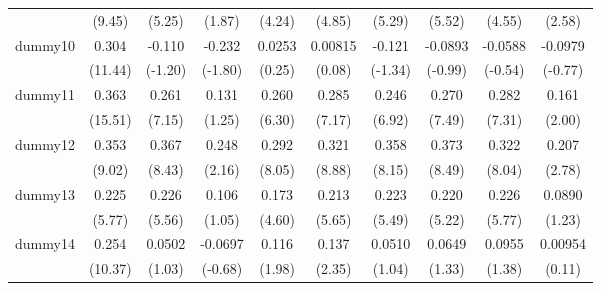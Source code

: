 {\begin{tabular}{l*{9}{c}}
            &      (9.45)         &      (5.25)         &      (1.87)         &      (4.24)         &      (4.85)         &      (5.29)         &      (5.52)         &      (4.55)         &      (2.58)         \\
[1em]
dummy10     &       0.304\sym{***}&      -0.110         &      -0.232         &      0.0253         &     0.00815         &      -0.121         &     -0.0893         &     -0.0588         &     -0.0979         \\
            &     (11.44)         &     (-1.20)         &     (-1.80)         &      (0.25)         &      (0.08)         &     (-1.34)         &     (-0.99)         &     (-0.54)         &     (-0.77)         \\
[1em]
dummy11     &       0.363\sym{***}&       0.261\sym{***}&       0.131         &       0.260\sym{***}&       0.285\sym{***}&       0.246\sym{***}&       0.270\sym{***}&       0.282\sym{***}&       0.161\sym{*}  \\
            &     (15.51)         &      (7.15)         &      (1.25)         &      (6.30)         &      (7.17)         &      (6.92)         &      (7.49)         &      (7.31)         &      (2.00)         \\
[1em]
dummy12     &       0.353\sym{***}&       0.367\sym{***}&       0.248\sym{*}  &       0.292\sym{***}&       0.321\sym{***}&       0.358\sym{***}&       0.373\sym{***}&       0.322\sym{***}&       0.207\sym{**} \\
            &      (9.02)         &      (8.43)         &      (2.16)         &      (8.05)         &      (8.88)         &      (8.15)         &      (8.49)         &      (8.04)         &      (2.78)         \\
[1em]
dummy13     &       0.225\sym{***}&       0.226\sym{***}&       0.106         &       0.173\sym{***}&       0.213\sym{***}&       0.223\sym{***}&       0.220\sym{***}&       0.226\sym{***}&      0.0890         \\
            &      (5.77)         &      (5.56)         &      (1.05)         &      (4.60)         &      (5.65)         &      (5.49)         &      (5.22)         &      (5.77)         &      (1.23)         \\
[1em]
dummy14     &       0.254\sym{***}&      0.0502         &     -0.0697         &       0.116\sym{*}  &       0.137\sym{*}  &      0.0510         &      0.0649         &      0.0955         &     0.00954         \\
            &     (10.37)         &      (1.03)         &     (-0.68)         &      (1.98)         &      (2.35)         &      (1.04)         &      (1.33)         &      (1.38)         &      (0.11)         \\

\end{tabular}}
